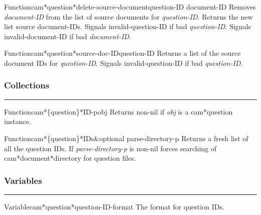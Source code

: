 \begin{functiondoc}{Function}{cam*question*delete-source-document}{question-ID document-ID}
Removes {\em document-ID} from the list of source documents for {\em question-ID}.
Returns the new list source document-IDs.
Signals invalid-question-ID if bad {\em question-ID}.
Signals invalid-document-ID if bad {\em document-ID}.
\end{functiondoc}

\begin{functiondoc}{Function}{cam*question*source-doc-ID}{question-ID}
Returns a list of the source document IDs for {\em question-ID}.
Signals invalid-question-ID if bad {\em question-ID}.
\end{functiondoc}


\subsubsection*{Collections}
\par\vspace*{0.00in}\par\hrule\par\medskip\par


\begin{functiondoc}{Function}{cam*\{question\}*ID-p}{obj}
Returns non-nil if {\em obj} is a cam*question instance.
\end{functiondoc}

\begin{functiondoc}{Function}{cam*\{question\}*IDs}{\&optional parse-directory-p}
Returns a fresh list of all the question IDs.
If {\em parse-directory-p} is non-nil forces searching of cam*document*directory for 
question files.
\end{functiondoc}


\subsubsection*{Variables}
\par\vspace*{0.00in}\par\hrule\par\medskip\par


\begin{functiondoc}{Variable}{cam*question*question-ID-format}{}
The format for question IDs.
\end{functiondoc}



